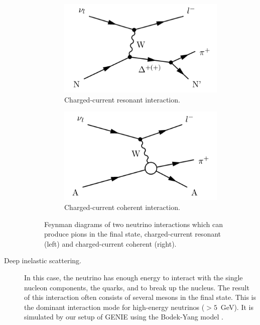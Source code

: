 \begin{description}
\begin{figure}[htbp]
  \begin{subfigure}{0.48\textwidth}
    \begin{center}
    \includegraphics[width=\linewidth]{figures/ccres_feyn.png}
    \caption{Charged-current resonant interaction.}
    \label{fig:ccres_feyn}
    \end{center}
  \end{subfigure}\hfill
  \begin{subfigure}{0.48\textwidth}
    \begin{center}
    \includegraphics[width=\linewidth]{figures/ccoh_feyn.png}
    \caption{Charged-current coherent interaction.}
    \label{fig:ccoh_feyn}
    \end{center}
  \end{subfigure}
  \caption{Feynman diagrams of two neutrino interactions which can produce pions in the final state, charged-current resonant (left) and charged-current coherent (right).}
\end{figure}

\item[Deep inelastic scattering.] In this case, the neutrino has enough energy to interact with the single nucleon components, the quarks, and to break up the nucleus. The result of this interaction often consists of several mesons in the final state. This is the dominant interaction mode for high-energy neutrinos ($>5$~GeV). It is simulated by our setup of GENIE using the Bodek-Yang model \cite{Yang:1998zb}.


\end{description}
